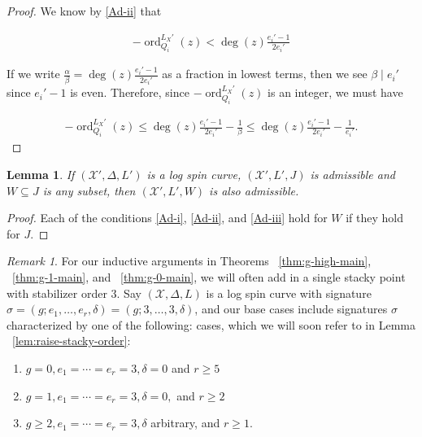 \documentclass{amsart}
\theoremstyle{plain}
\newtheorem{lem}[thm]{Lemma}
\theoremstyle{definition}
\theoremstyle{remark}
\newtheorem{rem}[thm]{Remark}
\numberwithin{equation}{section}
\DeclareMathOperator{\ord}{ord}
\newcommand\sx{\mathscr X}
\newcommand \subhalf[1]{\frac{{#1} - 1}{2{#1}}}
\newcommand{\halfcan}{L}
\begin{document}
\begin{proof}
We know by \ref{Ad-ii} that

\begin{align*}
	-\ord_{Q_i}
^{\halfcan_X'}(z) < \deg(z) \subhalf{e_i'}
\end{align*}

\noindent
If we write $\frac{\alpha}{\beta} = \deg(z) \frac{e_i'- 1}{2e_i'}$ 
as a fraction in lowest terms, then we see $\beta \mid e_i'$ since $
e_i'- 1$ is even. Therefore, since $-\ord_{Q_i}
^{\halfcan_X'}(z)$ is an integer, 
we must have

\begin{align*}
	-\ord_{Q_i}
^{\halfcan_X'}(z) \leq \deg(z) \subhalf{e_i'} - \frac{1}{\beta} \leq 
	\deg(z) \subhalf{e_i'} - \frac{1}{e_i'}.
\end{align*}
\end{proof}

\begin{lem}
\label{lem:admissible_subset}
If $(\sx',\Delta,L')$ is a log spin curve, $(\sx',L', J)$ is admissible and $W \subseteq J$ is any subset,
then $(\sx', L', W)$ is also admissible.
\end{lem}

\begin{proof}
Each of the conditions \ref{Ad-i}, \ref{Ad-ii}, and \ref{Ad-iii} hold for $W$
if they hold for $J$.
\end{proof}

\begin{rem}
\label{rem:three-cases}
For our inductive arguments in Theorems ~\ref{thm:g-high-main}, ~\ref{thm:g-1-main}, and ~\ref{thm:g-0-main}, we will often add in a single
stacky point with stabilizer order $3$. Say $(\sx,\Delta,\halfcan)$ is a log spin
curve with signature $\sigma = (g;e_1,\ldots, e_r,\delta) = (g;3,\ldots, 3,
\delta)$, and our base cases include signatures $\sigma$ characterized by one of the following: cases, which we will soon refer to in Lemma ~\ref{lem:raise-stacky-order}:
\begin{enumerate}
	\item $g = 0, e_1 = \cdots = e_r = 3, \delta = 0$ and $r \geq 5$
	\item $g = 1, e_1 = \cdots = e_r = 3, \delta = 0,$ and $ r \geq 2$
	\item $g \geq 2, e_1 = \cdots = e_r = 3, \delta$ arbitrary, and $r \geq 1$.
\end{enumerate}
\end{rem}
\end{document}
